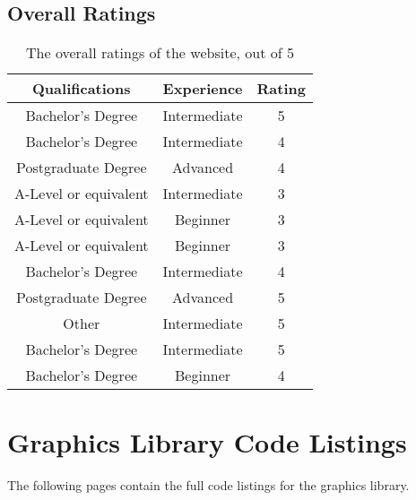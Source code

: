 \documentclass[../main.tex]{subfiles}
\begin{document}
        \section*{Overall Ratings}
            \begin{table}[H]
                \centering
                \begin{tabular}{c|c|c}
                    \textbf{Qualifications} & \textbf{Experience} & \textbf{Rating} \\
                    \hline
                    Bachelor's Degree       & Intermediate        & 5               \\
                    Bachelor's Degree       & Intermediate        & 4               \\
                    Postgraduate Degree     & Advanced            & 4               \\
                    A-Level or equivalent   & Intermediate        & 3               \\
                    A-Level or equivalent   & Beginner            & 3               \\
                    A-Level or equivalent   & Beginner            & 3               \\
                    Bachelor's Degree       & Intermediate        & 4               \\
                    Postgraduate Degree     & Advanced            & 5               \\
                    Other                   & Intermediate        & 5               \\
                    Bachelor's Degree       & Intermediate        & 5               \\
                    Bachelor's Degree       & Beginner            & 4               \\
                \end{tabular}
                \caption{The overall ratings of the website, out of 5}
            \end{table}

    \chapter{Graphics Library Code Listings} \label{app:code}
        The following pages contain the full code listings for the graphics library.

\end{document}
